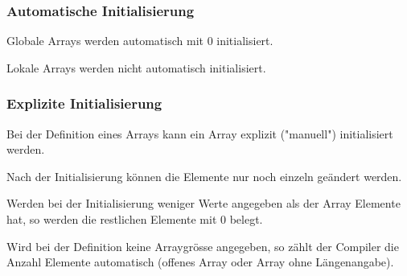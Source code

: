 		\vspace*{0.1cm}
		
		\begin{minipage}[t]{9 cm}
			\subsubsection{Automatische Initialisierung }	
				\begin{compactitem}
					\item Globale Arrays werden automatisch mit 0 initialisiert.
					\item Lokale Arrays werden nicht automatisch initialisiert.
				\end{compactitem}
				
			\subsubsection{Explizite Initialisierung }	
				\begin{compactitem}
					\item Bei der Definition eines Arrays kann ein Array explizit ("manuell") initialisiert werden.
					\item Nach der Initialisierung können die Elemente nur noch einzeln geändert werden.
				\end{compactitem}
				
				\begin{compactitem}
					\item Werden bei der Initialisierung weniger Werte angegeben als der Array Elemente hat, so werden die restlichen Elemente mit 0 belegt.
				\end{compactitem}
				
				\begin{compactitem}
					\item Wird bei der Definition keine Arraygrösse angegeben, so zählt der Compiler die Anzahl Elemente automatisch (offenes Array oder Array ohne Längenangabe).
				\end{compactitem}
				
		\end{minipage}
		\hspace*{0.5cm}
